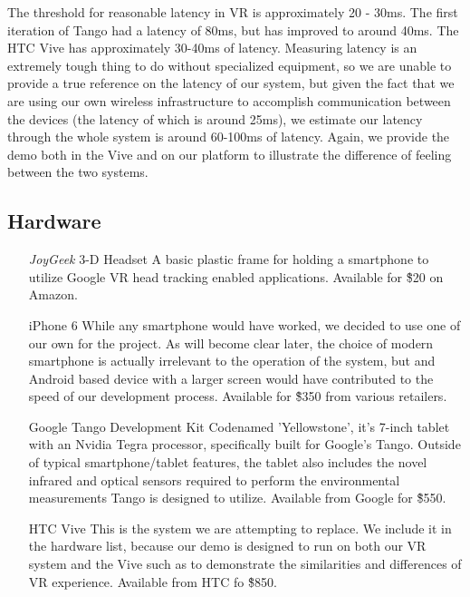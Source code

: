 \documentclass{report}
\begin{document}
	The threshold for reasonable latency in VR is approximately 20 - 30ms. The first iteration of Tango had a latency of 80ms, but has improved to around 40ms. The HTC Vive has approximately 30-40ms of latency. Measuring latency is an extremely tough thing to do without specialized equipment, so we are unable to provide a true reference  on the latency of our system, but given the fact that we are using our own wireless infrastructure to accomplish communication between the devices (the latency of which is around 25ms), we estimate our latency through the whole system is around 60-100ms of latency. Again, we provide the demo both in the Vive and on our platform to illustrate the difference of feeling between the two systems.
	
	\subsection*{Hardware}
	\begin{itemize}
		\item[\textit{JoyGeek} 3-D Headset] A basic plastic frame for holding a smartphone to utilize Google VR head tracking enabled applications. Available for \~\$20 on Amazon.
		\item[iPhone 6] While any smartphone would have worked, we decided to use one of our own for the project. As will become clear later, the choice of modern smartphone is actually irrelevant to the operation of the system, but and Android based device with a larger screen would have contributed to the speed of our development process. Available for \~\$350 from various retailers.
		\item[Google Tango Development Kit] Codenamed 'Yellowstone', it's 7-inch tablet with an Nvidia Tegra processor, specifically built for Google's Tango. Outside of typical smartphone/tablet features, the tablet also includes the novel infrared and optical sensors required to perform the environmental measurements Tango is designed to utilize. Available from Google for \~\$550.
		\item[HTC Vive] This is the system we are attempting to replace. We include it in the hardware list, because our demo is designed to run on both our VR system and the Vive such as to demonstrate the similarities and differences of VR experience. Available from HTC fo \~\$850.
	\end{itemize}
	
\end{document}
